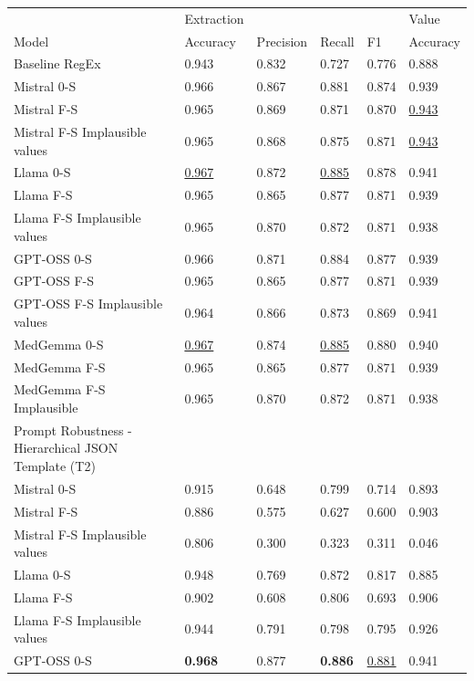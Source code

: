 \begin{tabular}{l|llll|l}
\toprule
& Extraction  &  &  & & Value \\
Model  & Accuracy & Precision & Recall & F1 & Accuracy \\
\midrule
Baseline RegEx & 0.943 & 0.832 &  0.727  &  0.776 & 0.888\\
\midrule
Mistral 0-S  & 0.966 &  0.867   & 0.881  & 0.874  & 0.939  \\
Mistral F-S   & 0.965 &  0.869   & 0.871  &  0.870  & \underline{0.943} \\
Mistral F-S Implausible values & 0.965 & 0.868    &  0.875 &  0.871  & \underline{0.943} \\
Llama 0-S  & \underline{0.967} &   0.872  &  \underline{0.885} &  0.878  &  0.941 \\
Llama F-S  &  0.965   &  0.865 &  0.877  & 0.871 & 0.939 \\
Llama F-S Implausible values &  0.965 &  0.870   &  0.872 &  0.871  & 0.938  \\
GPT-OSS 0-S   & 0.966 & 0.871 & 0.884  &  0.877  &  0.939 \\
GPT-OSS F-S  & 0.965  &  0.865   & 0.877 &  0.871  &  0.939 \\
GPT-OSS F-S Implausible values  & 0.964 &  0.866   & 0.873  &  0.869  &  0.941 \\
MedGemma 0-S  & \underline{0.967}  &  0.874   & \underline{0.885}  &  0.880  &  0.940 \\
MedGemma F-S  & 0.965  & 0.865 & 0.877  & 0.871   & 0.939  \\
MedGemma F-S Implausible  & 0.965 & 0.870   & 0.872  & 0.871 & 0.938   \\
\midrule
Prompt Robustness - Hierarchical JSON Template (T2) &  & &  &  \\
\midrule
Mistral 0-S  & 0.915  &   0.648   &   0.799  &   0.714 &  0.893 \\
Mistral F-S  &  0.886  &   0.575   &  0.627   &   0.600 & 0.903 \\
Mistral F-S Implausible values &  0.806  &   0.300   &  0.323   &   0.311 & 0.046  \\
Llama 0-S &  0.948  & 0.769  &  0.872 & 0.817 & 0.885 \\
Llama F-S &  0.902  &  0.608  &  0.806  & 0.693 & 0.906 \\
Llama F-S Implausible values &  0.944  &  0.791  &  0.798  & 0.795 & 0.926  \\
GPT-OSS 0-S  & \textbf{0.968}  &   0.877   &  \textbf{0.886}  &  \underline{0.881} & 0.941 \\

\end{tabular}
